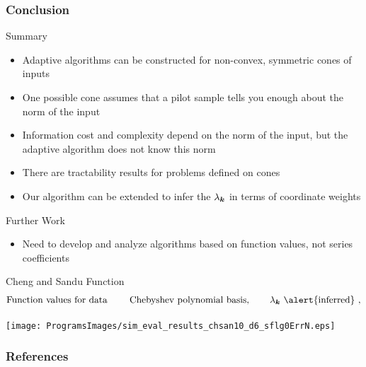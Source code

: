 \documentclass[10pt,compress,xcolor={usenames,dvipsnames},aspectratio=169]{beamer}
\begin{document}
\begin{frame}
	\frametitle{Conclusion}
	
	\vspace{-4ex}
	
	\alert{Summary}
	
	\vspace{-3ex}
	\begin{itemize}
		\item Adaptive algorithms can be constructed for non-convex, symmetric cones of inputs
		
		\item One possible cone assumes that a pilot sample tells you enough about the norm of the input
		
		\item Information cost and complexity depend on the norm of the input, but the adaptive algorithm does not  know this norm
		
		\item There are tractability results for problems defined on cones
		
		\item Our algorithm can be extended to infer the $\lambda_{\boldsymbol{k}}$ in terms of coordinate weights
	\end{itemize}

\alert{Further Work}

	\vspace{-3ex}
	\begin{itemize}
	\item Need to develop and analyze algorithms based on function values, not series coefficients
	
\end{itemize}


\end{frame}

\begin{frame}{Cheng and Sandu Function}
	\vspace{-9ex}
	\begin{gather*}
	\text{Function values for data \qquad Chebyshev polynomial basis}, \qquad \lambda_{\vk} \text{ \alert{inferred} }, 
	\end{gather*}
	
	
	\centerline{\texttt{[image: ProgramsImages/sim\_eval\_results\_chsan10\_d6\_sflg0ErrN.eps]}}
	
\end{frame}





\thankyouframe

\begin{frame}[allowframebreaks]
	\frametitle{References}
\printbibliography
\end{frame}
\end{document}
